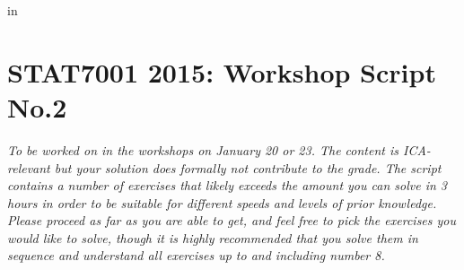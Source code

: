 
\topmargin   -3cm
\textwidth   6.2in
 in



\section*{STAT7001 2015: Workshop Script No.2}
{\em To be worked on in the workshops on January 20 or 23. The content is ICA-relevant but your solution does formally not contribute to the grade. The script contains a number of exercises that likely exceeds the amount you can solve in 3 hours in order to be suitable for different speeds and levels of prior knowledge. Please proceed as far as you are able to get, and feel free to pick the exercises you would like to solve, though it is highly recommended that you solve them in sequence and understand all exercises up to and including number 8.}

